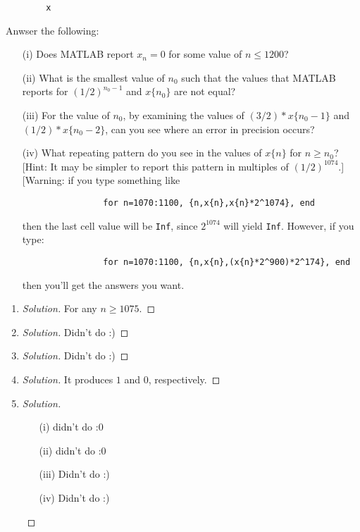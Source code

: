 \documentclass{article}
\begin{document}
\begin{enumerate}
\begin{verbatim}
		x
		\end{verbatim}
		Anwser the following:
		\begin{enumerate}
			\item[(i)] Does MATLAB report $x_n = 0$ for some value of $n \leq 1200$?
			\item[(ii)] What is the smallest value of $n_0$ such that
				the values that MATLAB reports for $(1/2)^{n_0-1}$ and $x\{n_0\}$ are not equal?
			\item[(iii)] For the value of $n_0$, by examining the values of
				$(3/2)*x\{n_0-1\}$ and $(1/2)*x\{n_0-2\}$,
				can you see where an error in precision occurs?
			\item[(iv)] What repeating pattern do you see in the values
				of $x\{n\}$ for $n \geq n_0$?
				[Hint: It may be simpler to report this pattern
				in multiples of $(1/2)^{1074}$.]
				[Warning: if you type something like
				\begin{verbatim}
				for n=1070:1100, {n,x{n},x{n}*2^1074}, end
				\end{verbatim}
				then the last cell value will be \verb|Inf|,
				since $2^{1074}$ will yield \verb|Inf|.
				However, if you type:
				\begin{verbatim}
				for n=1070:1100, {n,x{n},(x{n}*2^900)*2^174}, end
				\end{verbatim}
				then you'll get the answers you want.
		\end{enumerate}
\end{enumerate}

\begin{enumerate}
	\item \begin{proof}[Solution]\let\qed\relax
		For any $n \geq 1075$.
	\end{proof}
	\item \begin{proof}[Solution]\let\qed\relax
		Didn't do :)
	\end{proof}
	\item \begin{proof}[Solution]\let\qed\relax
		Didn't do :)
	\end{proof}
	\item \begin{proof}[Solution]\let\qed\relax
		It produces $1$ and $0$, respectively.
	\end{proof}
	\item \begin{proof}[Solution]\let\qed\relax
		\begin{enumerate}
			\item[(i)] didn't do :0
			\item[(ii)] didn't do :0
			\item[(iii)] Didn't do :)
			\item[(iv)] Didn't do :)
		\end{enumerate}
	\end{proof}
\end{enumerate}
\end{document}
